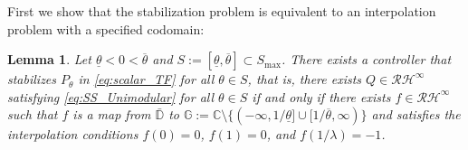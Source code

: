 \documentclass[letterpaper, 12pt, draftcls, onecolumn]{ieeeconf}
\newtheorem{lemma}[theorem]{Lemma}
\begin{document}
First we show that
the stabilization problem is equivalent
to an interpolation problem with a specified codomain:
\begin{lemma}
	\label{thm:SStoInt}
	{\it 
		Let $\underline \theta < 0 < \overline \theta$ and 
		$S := [\underline \theta, \overline \theta] \subset S_{\max}$.
		There exists a controller that stabilizes
		$P_{\theta}$ in \eqref{eq:scalar_TF} 
		for all $\theta \in S$, that is,
		there exists $Q \in \mathcal{RH}^{\infty}$ satisfying
		\eqref{eq:SS_Unimodular} for all $\theta \in S$
		if and only if
		there exists $f \in \mathcal{RH}^{\infty}$ such that 
		$f$ is a map from $\bar{\mathbb{D}}$ to
		$\mathbb{G} := \mathbb{C} \setminus
		\{(-\infty, 1/\underline \theta] \cup [1/\overline \theta,\infty) \}$ and
		satisfies
		the interpolation conditions $f(0) = 0$, $f(1) = 0$, 
		and $f(1/\lambda) = -1$. 
	}
\end{lemma}
\end{document}
